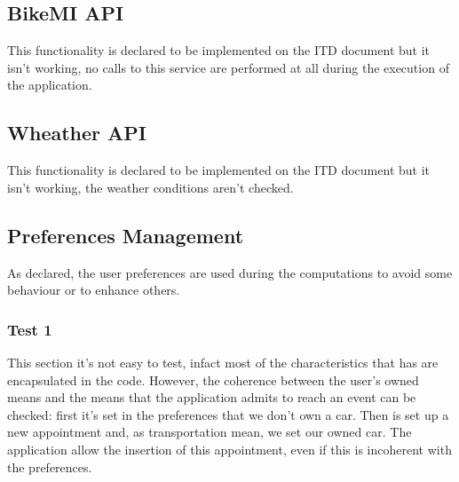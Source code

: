 
\subsection{BikeMI API}
This functionality is declared to be implemented on the ITD document but it isn't working, no calls to this service are performed at all during the execution of the application.

\subsection{Wheather API}
This functionality is declared to be implemented on the ITD document but it isn't working, the weather conditions aren't checked.

\subsection{Preferences Management}
As declared, the user preferences are used during the computations to avoid some behaviour or to enhance others.

\subsubsection{Test 1}
This section it's not easy to test, infact most of the characteristics that has are encapsulated in the code. However, the coherence between the user's owned means and the means that the application admits to reach an event can be checked: first it's set in the preferences that we don't own a car. Then is set up a new appointment and, as transportation mean, we set our owned car. The application allow the insertion of this appointment, even if this is incoherent with the preferences.

